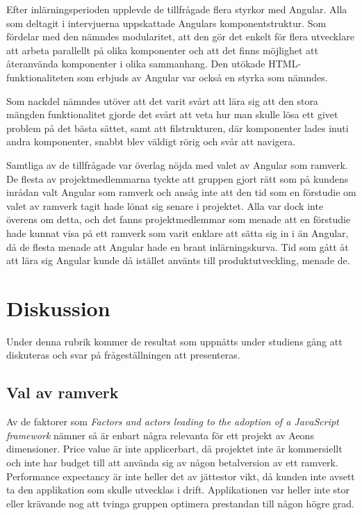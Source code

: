 Efter inlärningsperioden upplevde de tillfrågade flera styrkor med Angular. Alla som deltagit i intervjuerna uppskattade Angulars komponentstruktur. Som fördelar med den nämndes modularitet, att den gör det enkelt för flera utvecklare att arbeta parallellt på olika komponenter och att det finns möjlighet att återanvända komponenter i olika sammanhang. Den utökade HTML-funktionaliteten som erbjuds av Angular var också en styrka som nämndes.

Som nackdel nämndes utöver att det varit svårt att lära sig att den stora mängden funktionalitet gjorde det svårt att veta hur man skulle lösa ett givet problem på det bästa sättet, samt att filstrukturen, där komponenter lades inuti andra komponenter, snabbt blev väldigt rörig och svår att navigera.

Samtliga av de tillfrågade var överlag nöjda med valet av Angular som ramverk. De flesta av projektmedlemmarna tyckte att gruppen gjort rätt som på kundens inrådan valt Angular som ramverk och ansåg inte att den tid som en förstudie om valet av ramverk tagit hade lönat sig senare i projektet. Alla var dock inte överens om detta, och det fanns projektmedlemmar som menade att en förstudie hade kunnat visa på ett ramverk som varit enklare att sätta sig in i än Angular, då de flesta menade att Angular hade en brant inlärningskurva. Tid som gått åt att lära sig Angular kunde då istället använts till produktutveckling, menade de.   


\section{Diskussion}

Under denna rubrik kommer de resultat som uppnåtts under studiens gång att diskuteras och svar på frågeställningen att presenteras.

\subsection{Val av ramverk}

Av de faktorer som \textit{Factors and actors leading to the adoption of a JavaScript framework} nämner så är enbart några relevanta för ett projekt av Aeons dimensioner. Price value är inte applicerbart, då projektet inte är kommersiellt och inte har budget till att använda sig av någon betalversion av ett ramverk. Performance expectancy är inte heller det av jättestor vikt, då kunden inte avsett ta den applikation som skulle utvecklas i drift. Applikationen var heller inte stor eller krävande nog att tvinga gruppen optimera prestandan till någon högre grad.

